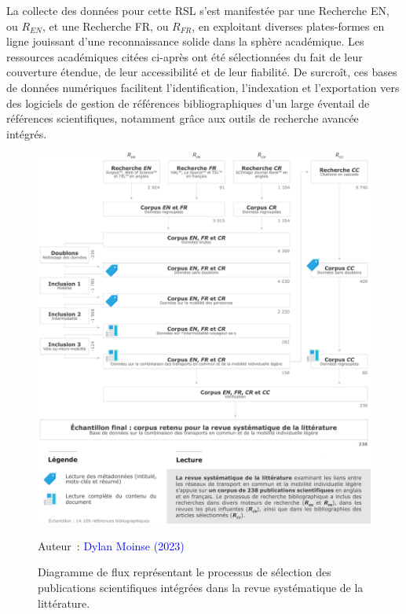 \begin{refsegment}
La collecte des données pour cette \acrshort{RSL} s'est manifestée par une \acrfull{Recherche EN}, ou \(R_{EN}\), et une \acrfull{Recherche FR}, ou \(R_{FR}\), en exploitant diverses plates-formes en ligne jouissant d'une reconnaissance solide dans la sphère académique. Les ressources académiques citées ci-après ont été sélectionnées du fait de leur couverture étendue, de leur accessibilité et de leur fiabilité. De surcroît, ces bases de données numériques facilitent l'identification, l'indexation et l'exportation vers des logiciels de gestion de références bibliographiques d'un large éventail de références scientifiques, notamment grâce aux outils de recherche avancée intégrés.%

    \begin{figure}[h!]\vspace*{4pt}
        \caption{Diagramme de flux représentant le processus de sélection des publications scientifiques intégrées dans la revue systématique de la littérature.}
        \label{fig-chap2:diagramme-flux-selection-publications-rsl}
        \centerline{\includegraphics[width=1\columnwidth]{src/Figures/Chap-2/FR_RSL_Diagramme_flux_selection_publications.pdf}}
        \vspace{5pt}
        \begin{flushright}\scriptsize{
        Auteur~: \textcolor{blue}{Dylan Moinse (2023)}
        }\end{flushright}
    \end{figure}


\end{refsegment}
